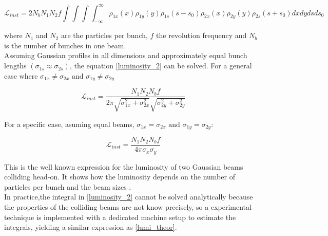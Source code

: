 \begin{equation}
  \mathcal{L}_{inst}= 2N_{b} N_{1}N_{2}f \int\int\int\int_{-\infty}^{\infty}  \rho_{1x}(x)\rho_{1y}(y)\rho_{1s}(s-s_{0})\rho_{2x}(x)\rho_{2y}(y)\rho_{2s}(s+s_{0}) dxdydsds_{0}
    \label{luminosity_2}
\end{equation}

where $N_{1}$ and $N_{2}$ are the particles per bunch, $f$ the revolution frequency and $N_{b}$ is the number of bunches in one beam.\\





Assuming Gaussian profiles in all dimensions and approximately equal bunch lengths $(\sigma_{1s}\approx \sigma_{2s})$, the equation \ref{luminosity_2} can be solved.
For a general case where $\sigma_{1x}\neq \sigma_{2x} \text{ and } \sigma_{1y}\neq \sigma_{2y}$

\begin{equation}
  \mathcal{L}_{inst}= \frac{N_{1} N_{2} N_{b}f }{2\pi \sqrt{\sigma_{1x}^{2}+\sigma_{2x}^{2}}\sqrt{\sigma_{2y}^{2}+\sigma_{2y}^{2}}}
  \label{lumi_general}
\end{equation}

For a specific case, asuming equal beams, $\sigma_{1x}= \sigma_{2x} \text{ and } \sigma_{1y}= \sigma_{2y}$:

\begin{equation}
  \mathcal{L}_{inst}= \frac{N_{1} N_{2} N_{b}f }{4\pi \sigma_{x} \sigma_{y}}
  \label{lumi_theor}
\end{equation}

This is the well known expression for the luminosity of two Gaussian beams colliding head-on. It shows how the luminosity depends on the number of particles per bunch and the beam sizes \cite{concept_of_luminosity}.\\

In practice,the integral in  \ref{luminosity_2} cannot be solved analytically because   the properties of the colliding beams are not know precisely, so a experimental technique is implemented with a dedicated machine setup to estimate the integrals, yielding a similar expression as \ref{lumi_theor}.

